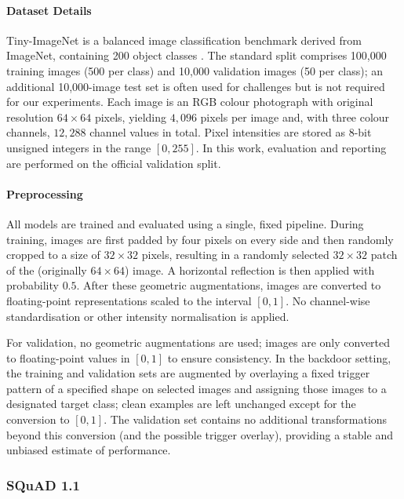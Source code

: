 \documentclass{article}
\theoremstyle{plain}
\theoremstyle{definition}
\theoremstyle{remark}
\begin{document}
\paragraph{Dataset Details}
Tiny-ImageNet is a balanced image classification benchmark derived from ImageNet, containing 200 object classes \cite{krizhevsky_learning_2009}. The standard split comprises 100{,}000 training images (500 per class) and 10{,}000 validation images (50 per class); an additional 10{,}000-image test set is often used for challenges but is not required for our experiments. Each image is an RGB colour photograph with original resolution $64\times 64$ pixels, yielding $4{,}096$ pixels per image and, with three colour channels, $12{,}288$ channel values in total. Pixel intensities are stored as 8-bit unsigned integers in the range $[0, 255]$. In this work, evaluation and reporting are performed on the official validation split.

\paragraph{Preprocessing}
All models are trained and evaluated using a single, fixed pipeline. During training, images are first padded by four pixels on every side and then randomly cropped to a size of $32\times 32$ pixels, resulting in a randomly selected $32\times 32$ patch of the (originally $64\times 64$) image. A horizontal reflection is then applied with probability $0.5$. After these geometric augmentations, images are converted to floating-point representations scaled to the interval $[0,1]$. No channel-wise standardisation or other intensity normalisation is applied.

For validation, no geometric augmentations are used; images are only converted to floating-point values in $[0,1]$ to ensure consistency. In the backdoor setting, the training and validation sets are augmented by overlaying a fixed trigger pattern of a specified shape on selected images and assigning those images to a designated target class; clean examples are left unchanged except for the conversion to $[0,1]$. The validation set contains no additional transformations beyond this conversion (and the possible trigger overlay), providing a stable and unbiased estimate of performance.



\subsubsection{SQuAD 1.1}
\label{sqaudapp}
\end{document}
